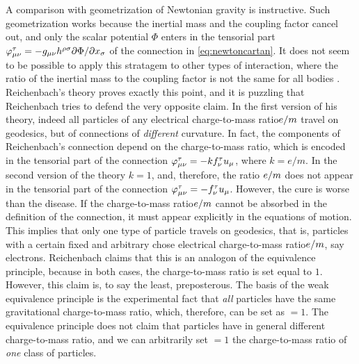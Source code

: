 \documentclass[submitted]{article}
\newcommand{\ctmr}{charge-to-mass ratio\xspace}
\newcommand{\ctmrf}{\ensuremath{\hfrac{e}{m}}\xspace}
\newcommand{\RTo}{\ensuremath{\varphi\tmn=-k f^\tau_\nu u_\mu}\xspace}
\newcommand{\RTt}{\ensuremath{\varphi\tmn=-f^\tau_\nu u_\mu}\xspace}
\newcommand{\FT}{\ensuremath{\varphi\tmn = - g_{\mu \nu} h^{\rho \sigma} \hfrac{\partial \Phi}{\partial x_\sigma}}\xspace}
\begin{document}
A comparison with  geometrization of Newtonian gravity is instructive. Such geometrization works because the inertial mass and the coupling factor cancel out, and only the scalar potential $\Phi$ enters in the tensorial part \FT of the connection in \cref{eq:newtoncartan}. It does not seem to be possible to apply this stratagem to other types of interaction, where the ratio of the inertial mass to the coupling factor is not the same for all bodies \citep[197]{Friedman1983}. Reichenbach's theory proves exactly this point, and it is puzzling that Reichenbach tries to defend the very opposite claim. In the first version of his theory, indeed all particles of any electrical \ctmr \ctmrf travel on geodesics, but of connections of \emph{different} curvature. In fact, the components of Reichenbach's connection depend on the \ctmr, which is encoded in the tensorial part of the connection \RTo, where $k= e/m$. In the second version of the theory $k=1$, and, therefore, the ratio \ctmrf does not appear in the tensorial part of the connection \RTt. However, the cure is worse than the disease. If the \ctmr \ctmrf cannot be absorbed in the definition of the connection, it must appear explicitly in the equations of motion. This implies that only one type of particle travels on geodesics, that is, particles with a certain fixed and arbitrary chose electrical \ctmr \ctmrf, say electrons. Reichenbach claims that this is an analogon of the equivalence principle, because in both cases, the \ctmr is set equal to $1$. However, this claim is, to say the least, preposterous. The basis of the weak equivalence principle is the experimental fact that \emph{all} particles have the same gravitational \ctmr, which, therefore, can be set as $=1$. The equivalence principle does not claim that particles have in general different \ctmr, and we can arbitrarily set $=1$ the \ctmr of \emph{one} class of particles. 
\end{document}

